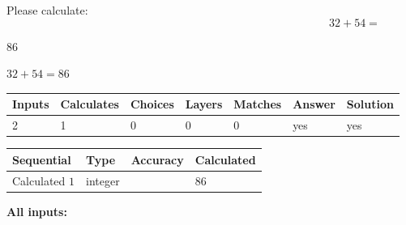 \documentclass[12pt]{article}
\begin{document}
Please calculate:
\begin{equation}
32 +  %
54 = \nonumber
\end{equation}
 
 
 
\noindent{}
 
 

86
 
 
\noindent{}
 
 

 
 
 
\noindent{}
 
 

$ %
32 +  %
54=   %
86$
 
 
\noindent{}
 
 

 
   
   
   
   
\noindent\begin{tabular}{|l|l|l|l|l|l|l|}
 \hline
Inputs & Calculates & Choices & Layers & Matches & Answer & Solution \\ \hline
 2  & 
 1  & 
 0
  & 
 0  & 
 0  & 
  yes & 
  yes 
  \\ \hline
 \end{tabular}
   
   
   
   
\noindent{}
   
   
  
  
\noindent\begin{tabular}{|l|l|l|l|}
\hline
 Sequential & Type & Accuracy & Calculated \\ 
\hline
 
 
  Calculated $  1 $ & integer &  & 
  $ 86 $ 
 \\  \hline  
 \end{tabular}
   
   
   
   
\noindent\vspace{0.1in}\hspace{-0.08in} {\textbf{\Large{All inputs: }}}
   
   
  
\end{document}
